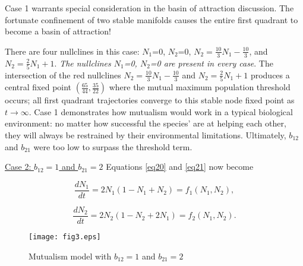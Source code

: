\documentclass[11pt,a4paper]{scrartcl}
\theoremstyle{definition}
\begin{document}
Case 1 warrants special consideration in the basin of attraction discussion. The fortunate confinement of two stable manifolds causes the entire first quadrant to become a basin of attraction!\newline

There are four nullclines in this case: $N_1$=0, $N_2$=0,  $N_2=\frac{10}{3}N_1-\frac{10}{3}$, and  $N_2=\frac{2}{5}N_1+1$. \textit{The nullclines $N_1$=0, $N_2$=0 are present in every case}. The intersection of the red nullclines $N_2=\frac{10}{3}N_1-\frac{10}{3}$ and $N_2=\frac{2}{5}N_1+1$ produces a central fixed point $(\frac{65}{44},\frac{35}{22})$ where the mutual maximum population threshold occurs; all first quadrant trajectories converge to this stable node fixed point as $t \rightarrow \infty$. Case 1 demonstrates how mutualism would work in a typical biological environment: no matter how successful the species' are at helping each other, they will always be restrained by their environmental limitations. Ultimately, $b_{12}$ and $b_{21}$ were too low to surpass the threshold term.\newline

\underline{Case 2: $b_{12} = 1$ and $b_{21} = 2$}
\newline\newline
Equations \eqref{eq20} and \eqref{eq21} now become 

\begin{equation} \label{eq24}
	\frac{dN_1}{dt}=2N_1(1-N_1+N_2)=f_1(N_1, N_2),
\end{equation}

\begin{equation} \label{eq25}
	\frac{dN_2}{dt}=2N_2(1-N_2+2N_1)=f_2(N_1, N_2).
\end{equation}

\begin{figure}[!ht]
\centering
\texttt{[image: fig3.eps]}
\caption{Mutualism model with $b_{12} = 1$ and $b_{21} = 2$}
\label{figM2}
\end{figure}
\end{document}
